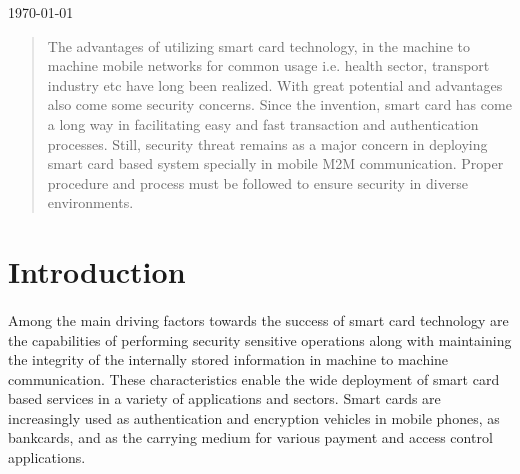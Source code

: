 \documentclass[12pt]{article}
\begin{document}
\begin{titlepage}


{\large \today}\\[.5cm] %



 

\vfill %

\end{titlepage}

\tableofcontents

\newpage
\begin{abstract}
The advantages of utilizing smart card technology, in the machine to machine mobile networks for common usage i.e.
health sector, transport industry etc have long been realized. With great potential and advantages also come some security concerns. Since the invention, smart card has come a long way in facilitating easy and fast transaction and authentication processes. Still, security threat remains as a major concern in deploying smart card based system specially in mobile M2M communication. Proper procedure and process must be followed to ensure security in diverse environments.
\end{abstract}

\section{Introduction}
\paragraph{}
Among the main driving factors towards the success
of smart card technology are the capabilities of
performing security sensitive operations along with
maintaining the integrity of the internally stored
information in machine to machine communication. These characteristics enable the wide
deployment of smart card based services in a variety of
applications and sectors. Smart cards are increasingly
used as authentication and encryption vehicles in
mobile phones, as bankcards, and as the carrying
medium for various payment and access control
applications.
\end{document}
